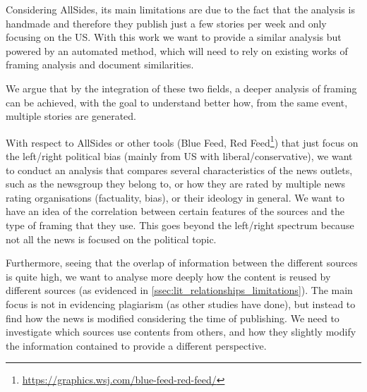 Considering AllSides, its main limitations are due to the fact that the analysis is handmade and therefore they publish just a few stories per week and only focusing on the US.
With this work we want to provide a similar analysis but powered by an automated method, which will need to rely on existing works of framing analysis and document similarities.




We argue that by the integration of these two fields, a deeper analysis of framing can be achieved, with the goal to understand better how, from the same event, multiple stories are generated.


With respect to AllSides or other tools (Blue Feed, Red Feed\footnote{\url{https://graphics.wsj.com/blue-feed-red-feed/}}) that just focus on the left/right political bias (mainly from US with liberal/conservative), we want to conduct an analysis that compares several characteristics of the news outlets, such as the newsgroup they belong to, or how they are rated by multiple news rating organisations (factuality, bias), or their ideology in general.
We want to have an idea of the correlation between certain features of the sources and the type of framing that they use. This goes beyond the left/right spectrum because not all the news is focused on the political topic.


Furthermore, seeing that the overlap of information between the different sources is quite high, we want to analyse more deeply how the content is reused by different sources (as evidenced in \ref{ssec:lit_relationships_limitations}). The main focus is not in evidencing plagiarism (as other studies have done), but instead to find how the news is modified considering the time of publishing.
We need to investigate which sources use contents from others, and how they slightly modify the information contained to provide a different perspective.

